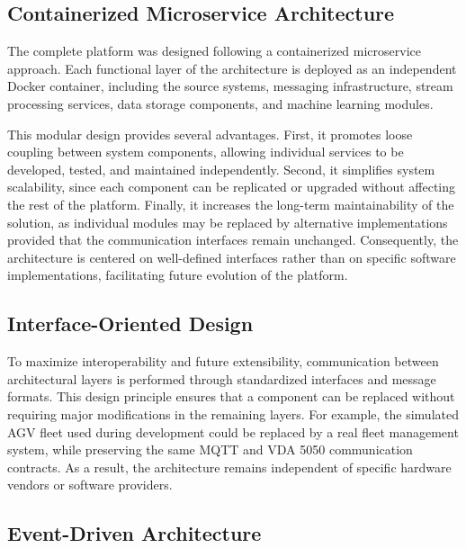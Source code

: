 \subsection{Containerized Microservice Architecture}

The complete platform was designed following a containerized microservice approach.
Each functional layer of the architecture is deployed as an independent Docker container, including the source systems, messaging infrastructure, stream processing services, data storage components, and machine learning modules.

This modular design provides several advantages.
First, it promotes loose coupling between system components, allowing individual services to be developed, tested, and maintained independently.
Second, it simplifies system scalability, since each component can be replicated or upgraded without affecting the rest of the platform.
Finally, it increases the long-term maintainability of the solution, as individual modules may be replaced by alternative implementations provided that the communication interfaces remain unchanged.
Consequently, the architecture is centered on well-defined interfaces rather than on specific software implementations, facilitating future evolution of the platform.

\subsection{Interface-Oriented Design}

To maximize interoperability and future extensibility, communication between architectural layers is performed through standardized interfaces and message formats.
This design principle ensures that a component can be replaced without requiring major modifications in the remaining layers.
For example, the simulated AGV fleet used during development could be replaced by a real fleet management system, while preserving the same MQTT and VDA 5050 communication contracts.
As a result, the architecture remains independent of specific hardware vendors or software providers.

\subsection{Event-Driven Architecture}

